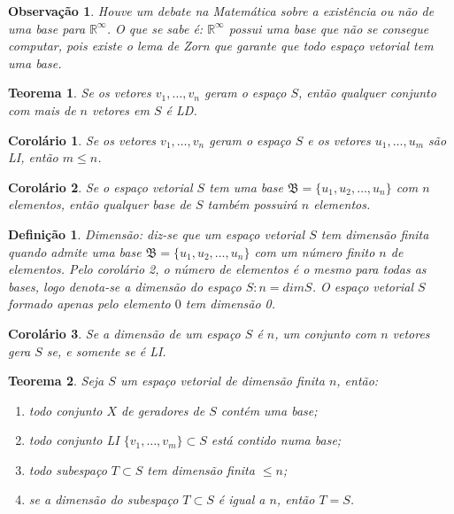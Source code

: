 \documentclass[a4paper,portuguese,9pt]{extarticle}
\newtheorem{theorem}{Teorema}[section]
\newtheorem*{definition}{Definição}
\newtheorem*{remark}{Observação}
\newtheorem{corollary}{Corolário}[section]
\begin{document}
\begin{multicols*}{2}
\begin{remark}
Houve um debate na Matemática sobre a existência ou não de uma base para $\mathbb{R^{\infty}}$. O que se sabe é: $\mathbb{R^{\infty}}$ possui uma base que não se consegue computar, pois existe o lema de Zorn que garante que todo espaço vetorial tem uma base.
\end{remark}

\begin{theorem}
Se os vetores $v_1, \ldots, v_n$ geram o espaço $S$, então qualquer conjunto com mais de $n$ vetores em $S$ é LD.
\end{theorem}

\begin{corollary}
Se os vetores $v_1, \ldots, v_n$ geram o espaço $S$ e os vetores $u_1, \ldots, u_m$ são LI, então $m \leq n$.
\end{corollary}

\begin{corollary}
Se o espaço vetorial $S$ tem uma base $\mathfrak{B} = \{u_1, u_2, \ldots, u_n\}$ com $n$ elementos, então qualquer base de $S$ também possuirá $n$ elementos.
\end{corollary}

\begin{definition}
Dimensão: diz-se que um espaço vetorial $S$ tem dimensão finita quando admite uma base $\mathfrak{B} = \{u_1, u_2, \ldots, u_n\}$ com um número finito $n$ de elementos. Pelo corolário 2, o número de elementos é o mesmo para todas as bases, logo denota-se a dimensão do espaço $S : n = dim S$. O espaço vetorial $S$ formado apenas pelo elemento $0$ tem dimensão 0.
\end{definition}

\begin{corollary}
Se a dimensão de um espaço $S$ é $n$, um conjunto com $n$ vetores gera $S$ se, e somente se é LI.
\end{corollary}

\begin{theorem}
Seja $S$ um espaço vetorial de dimensão finita $n$, então:
\begin{enumerate}[label=(\roman*)]
    \item todo conjunto $X$ de geradores de $S$ contém uma base;
    \item todo conjunto LI $\{v_1, \ldots, v_m\} \subset S$ está contido numa base;
    \item todo subespaço $T \subset S$ tem dimensão finita  $\leq n$;
    \item se a dimensão do subespaço $T \subset S$ é igual a $n$, então $T=S$.
\end{enumerate}
\end{theorem}


\end{multicols*}
\end{document}

